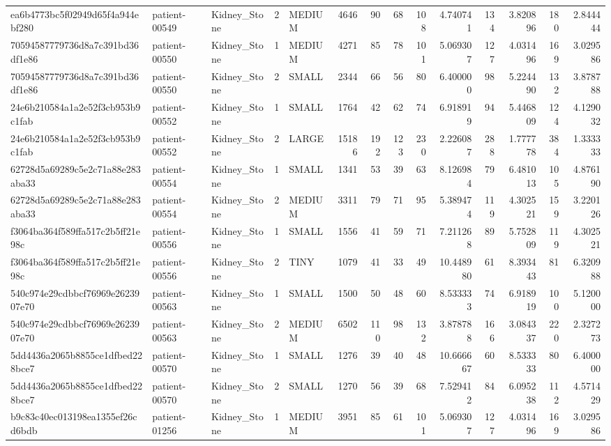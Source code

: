 \begin{tabular}{lllrlrrrrrrrrr}
ea6b4773bc5f02949d65f4a944ebf280 & patient-00549 & Kidney_Stone & 2 & MEDIUM & 4646 & 90 & 68 & 108 & 4.740741 & 134 & 3.820896 & 180 & 2.844444 \\
70594587779736d8a7c391bd36df1e86 & patient-00550 & Kidney_Stone & 1 & MEDIUM & 4271 & 85 & 78 & 101 & 5.069307 & 127 & 4.031496 & 169 & 3.029586 \\
70594587779736d8a7c391bd36df1e86 & patient-00550 & Kidney_Stone & 2 & SMALL & 2344 & 66 & 56 & 80 & 6.400000 & 98 & 5.224490 & 132 & 3.878788 \\
24e6b210584a1a2e52f3cb953b9c1fab & patient-00552 & Kidney_Stone & 1 & SMALL & 1764 & 42 & 62 & 74 & 6.918919 & 94 & 5.446809 & 124 & 4.129032 \\
24e6b210584a1a2e52f3cb953b9c1fab & patient-00552 & Kidney_Stone & 2 & LARGE & 15186 & 192 & 123 & 230 & 2.226087 & 288 & 1.777778 & 384 & 1.333333 \\
62728d5a69289c5e2c71a88e283aba33 & patient-00554 & Kidney_Stone & 1 & SMALL & 1341 & 53 & 39 & 63 & 8.126984 & 79 & 6.481013 & 105 & 4.876190 \\
62728d5a69289c5e2c71a88e283aba33 & patient-00554 & Kidney_Stone & 2 & MEDIUM & 3311 & 79 & 71 & 95 & 5.389474 & 119 & 4.302521 & 159 & 3.220126 \\
f3064ba364f589ffa517c2b5ff21e98c & patient-00556 & Kidney_Stone & 1 & SMALL & 1556 & 41 & 59 & 71 & 7.211268 & 89 & 5.752809 & 119 & 4.302521 \\
f3064ba364f589ffa517c2b5ff21e98c & patient-00556 & Kidney_Stone & 2 & TINY & 1079 & 41 & 33 & 49 & 10.448980 & 61 & 8.393443 & 81 & 6.320988 \\
540c974e29cdbbcf76969e2623907e70 & patient-00563 & Kidney_Stone & 1 & SMALL & 1500 & 50 & 48 & 60 & 8.533333 & 74 & 6.918919 & 100 & 5.120000 \\
540c974e29cdbbcf76969e2623907e70 & patient-00563 & Kidney_Stone & 2 & MEDIUM & 6502 & 110 & 98 & 132 & 3.878788 & 166 & 3.084337 & 220 & 2.327273 \\
5dd4436a2065b8855ce1dfbed228bce7 & patient-00570 & Kidney_Stone & 1 & SMALL & 1276 & 39 & 40 & 48 & 10.666667 & 60 & 8.533333 & 80 & 6.400000 \\
5dd4436a2065b8855ce1dfbed228bce7 & patient-00570 & Kidney_Stone & 2 & SMALL & 1270 & 56 & 39 & 68 & 7.529412 & 84 & 6.095238 & 112 & 4.571429 \\
b9c83c40ec013198ea1355ef26cd6bdb & patient-01256 & Kidney_Stone & 1 & MEDIUM & 3951 & 85 & 61 & 101 & 5.069307 & 127 & 4.031496 & 169 & 3.029586 \\

\end{tabular}
